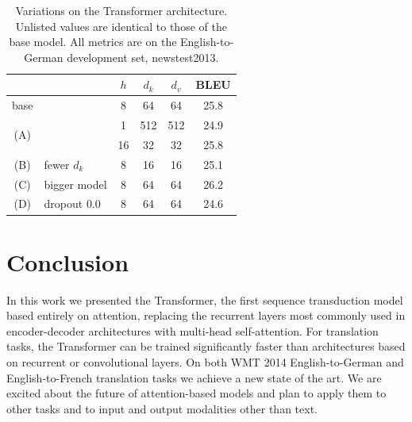 \documentclass[conference]{IEEEtran}
\begin{document}
\begin{table}[t]
\centering
\caption{Variations on the Transformer architecture. Unlisted values are identical
to those of the base model. All metrics are on the English-to-German development
set, newstest2013.}
\label{tab:variations}
\begin{tabular}{@{}clcccc@{}}
\toprule
 & & $h$ & $d_k$ & $d_v$ & BLEU \\
\midrule
base & & 8  & 64 & 64 & 25.8 \\
\midrule
\multirow{2}{*}{(A)} & & 1  & 512 & 512 & 24.9 \\
                     & & 16 & 32  & 32  & 25.8 \\
\midrule
(B) & fewer $d_k$        & 8 & 16 & 16 & 25.1 \\
(C) & bigger model       & 8 & 64 & 64 & 26.2 \\
(D) & dropout $0.0$      & 8 & 64 & 64 & 24.6 \\
\bottomrule
\end{tabular}
\end{table}

\section{Conclusion}
In this work we presented the Transformer, the first sequence transduction model
based entirely on attention, replacing the recurrent layers most commonly used in
encoder-decoder architectures with multi-head self-attention. For translation
tasks, the Transformer can be trained significantly faster than architectures
based on recurrent or convolutional layers. On both WMT 2014 English-to-German and
English-to-French translation tasks we achieve a new state of the art. We are
excited about the future of attention-based models and plan to apply them to other
tasks and to input and output modalities other than text.



\end{document}
